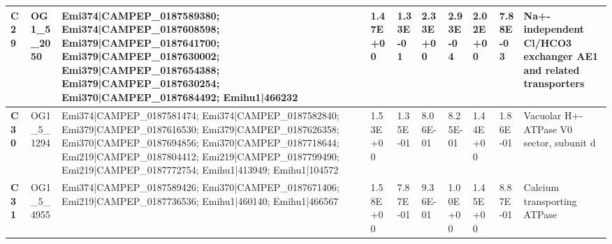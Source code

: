 \begin{landscape}
\begin{center}
\begin{footnotesize}
\begin{longtable}{|p{0.5cm}|p{1.5cm}|p{4cm}|l|l|l|l|l|l|l|}
\textbf{C29} & OG1\_5\_2050  & Emi374|CAMPEP\_0187589380; Emi374|CAMPEP\_0187608598; Emi379|CAMPEP\_0187641700; Emi379|CAMPEP\_0187630002; Emi379|CAMPEP\_0187654388; Emi379|CAMPEP\_0187630254; Emi370|CAMPEP\_0187684492; Emihu1|466232                                                                                                                                                                                                                                                                                                                                                                                                                               & 1.47E+00  & 1.33E-01 & 2.33E+00  & 2.93E-04 & 2.02E+00  & 7.88E-03 & Na+-independent Cl/HCO3 exchanger AE1 and related transporters               \\ \hline
\textbf{C30} & OG1\_5\_1294  & Emi374|CAMPEP\_0187581474; Emi374|CAMPEP\_0187582840; Emi379|CAMPEP\_0187616530; Emi379|CAMPEP\_0187626358; Emi370|CAMPEP\_0187694856; Emi370|CAMPEP\_0187718644; Emi219|CAMPEP\_0187804412; Emi219|CAMPEP\_0187799490; Emi219|CAMPEP\_0187772754; Emihu1|413949; Emihu1|104572                                                                                                                                                                                                                                                                                                                                                          & 1.53E+00  & 1.35E-01 & 8.06E-01  & 8.25E-01 & 1.44E+00  & 1.86E-01 & Vacuolar H+-ATPase V0 sector, subunit d                                      \\ \hline
\textbf{C31} & OG1\_5\_4955  & Emi374|CAMPEP\_0187589426; Emi370|CAMPEP\_0187671406; Emi219|CAMPEP\_0187736536; Emihu1|460140; Emihu1|466567                                                                                                                                                                                                                                                                                                                                                                                                                                                                                                                            & 1.58E+00  & 7.87E-01 & 9.36E-01  & 1.00E+00 & 1.45E+00  & 8.87E-01 & Calcium transporting ATPase                                                  \\ \hline

\end{longtable}
\end{footnotesize}
\end{center}
\end{landscape}
